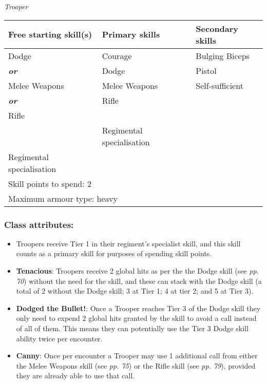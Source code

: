 \textit{Trooper}

\begin{table}[H]
\begin{tabular}{|l|l|l|} \hline 
Free starting skill(s) & Primary skills & Secondary skills \\
 \hline Dodge & Courage & Bulging Biceps \\
 \hline \textbf{\textit{or}} & Dodge & Pistol \\
 \hline Melee Weapons & Melee Weapons & Self-sufficient \\
 \hline \textbf{\textit{or}} & Rifle &  \\
 \hline Rifle &  &  \\
 \hline  & Regimental specialisation &  \\
 \hline Regimental specialisation &  &  \\
 \hline \multicolumn{3}{|l|}{Skill points to spend: 2} \\
 \hline \multicolumn{3}{|l|}{Maximum armour type: heavy} \\
 \hline \end{tabular}

\end{table}

\subsubsection{Class attributes:}

\begin{itemize}
\item Troopers receive Tier 1 in their regiment's specialist skill, and this skill counts as a primary skill for purposes of spending skill points.

\item \textbf{Tenacious}: Troopers receive 2 global hits as per the the Dodge skill (see \textit{pp. 70}) without the need for the skill, and these can stack with the Dodge skill (a total of 2 without the Dodge skill; 3 at Tier 1; 4 at tier 2; and 5 at Tier 3).

\item \textbf{Dodged the Bullet!}: Once a Trooper reaches Tier 3 of the Dodge skill they only need to expend 2 global hits granted by the skill to avoid a call instead of all of them. This means they can potentially use the Tier 3 Dodge skill ability twice per encounter.

\item \textbf{Canny}: Once per encounter a Trooper may use 1 additional call from either the Melee Weapons skill (see \textit{pp. 75}) or the Rifle skill (see \textit{pp. 79}), provided they are already able to use that call.

\end{itemize}
